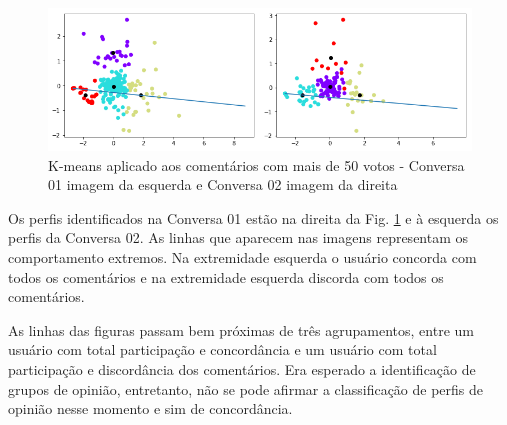 \begin{figure}[!h]
	\centering
	\includegraphics[keepaspectratio=true,scale=0.6]{figuras/tcc2/compara-pca-n50.png}
	\caption{K-means aplicado aos comentários com mais de 50 votos - Conversa 01 imagem da esquerda e Conversa 02 imagem da direita }
	\label{fig:k-means-conversas}
\end{figure}






Os perfis identificados na Conversa 01 estão na direita da Fig. \ref{fig:k-means-conversas} e à esquerda os perfis da Conversa 02.
As linhas que aparecem nas imagens 
representam os comportamento extremos. Na extremidade esquerda o usuário concorda com todos os comentários e na extremidade esquerda discorda com todos os comentários.





As linhas das figuras passam bem próximas de três agrupamentos, entre um usuário com total participação e concordância e um usuário com total participação e discordância dos comentários. Era esperado a identificação de grupos de opinião, entretanto, não se pode afirmar a classificação de perfis de opinião nesse momento e sim de concordância.





